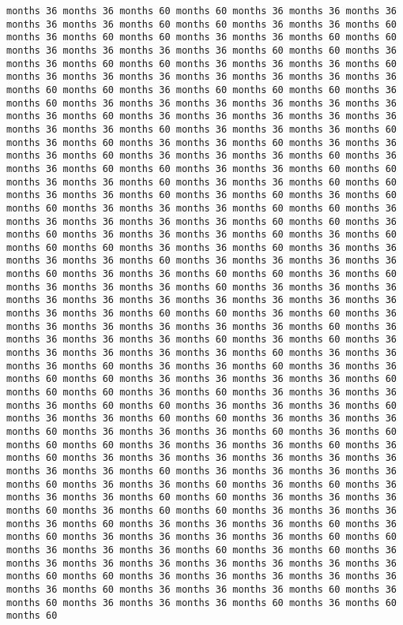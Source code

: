 \documentclass[11pt]{article}
\begin{document}
\begin{Verbatim}[commandchars=\\\{\}, frame=single, framerule=2mm, rulecolor=\color{outerrorbackground}]
months 36 months 36 months 60 months 60 months 36 months 36 months 36 months 36 months 36 months 60 months 60 months 36 months 36 months 60 months 36 months 60 months 60 months 36 months 36 months 60 months 60 months 36 months 36 months 36 months 36 months 60 months 60 months 36 months 36 months 60 months 60 months 36 months 36 months 36 months 60 months 36 months 36 months 36 months 36 months 36 months 36 months 36 months 60 months 60 months 36 months 60 months 60 months 60 months 36 months 60 months 36 months 36 months 36 months 36 months 36 months 36 months 36 months 60 months 36 months 36 months 36 months 36 months 36 months 36 months 36 months 60 months 36 months 36 months 36 months 60 months 36 months 60 months 36 months 36 months 60 months 36 months 36 months 36 months 60 months 36 months 36 months 36 months 60 months 36 months 36 months 60 months 60 months 36 months 36 months 60 months 60 months 36 months 36 months 60 months 36 months 36 months 60 months 60 months 36 months 36 months 60 months 36 months 60 months 36 months 60 months 60 months 36 months 36 months 36 months 60 months 60 months 36 months 36 months 36 months 36 months 36 months 60 months 60 months 36 months 60 months 36 months 36 months 36 months 60 months 36 months 60 months 60 months 60 months 36 months 36 months 60 months 36 months 36 months 36 months 36 months 60 months 36 months 36 months 36 months 36 months 60 months 36 months 36 months 60 months 60 months 36 months 60 months 36 months 36 months 36 months 60 months 36 months 36 months 36 months 36 months 36 months 36 months 36 months 36 months 36 months 36 months 36 months 36 months 60 months 60 months 36 months 60 months 36 months 36 months 36 months 36 months 36 months 36 months 60 months 36 months 36 months 36 months 36 months 60 months 36 months 60 months 36 months 36 months 36 months 36 months 36 months 60 months 36 months 36 months 36 months 60 months 36 months 36 months 60 months 36 months 36 months 60 months 60 months 36 months 36 months 36 months 36 months 60 months 60 months 60 months 36 months 60 months 36 months 36 months 36 months 36 months 60 months 60 months 36 months 36 months 36 months 60 months 36 months 36 months 60 months 60 months 36 months 36 months 36 months 60 months 36 months 36 months 36 months 60 months 36 months 60 months 60 months 60 months 36 months 36 months 36 months 60 months 36 months 60 months 36 months 36 months 36 months 36 months 36 months 36 months 36 months 36 months 60 months 36 months 36 months 36 months 36 months 60 months 36 months 36 months 60 months 36 months 60 months 36 months 36 months 36 months 60 months 60 months 36 months 36 months 36 months 60 months 36 months 60 months 60 months 36 months 36 months 36 months 36 months 60 months 36 months 36 months 36 months 60 months 36 months 60 months 36 months 36 months 36 months 36 months 60 months 60 months 36 months 36 months 36 months 60 months 36 months 60 months 36 months 36 months 36 months 36 months 36 months 36 months 36 months 36 months 60 months 60 months 36 months 36 months 36 months 36 months 36 months 36 months 60 months 36 months 36 months 36 months 60 months 36 months 60 months 36 months 36 months 36 months 60 months 36 months 60 months 60 
\end{Verbatim}
\end{document}
